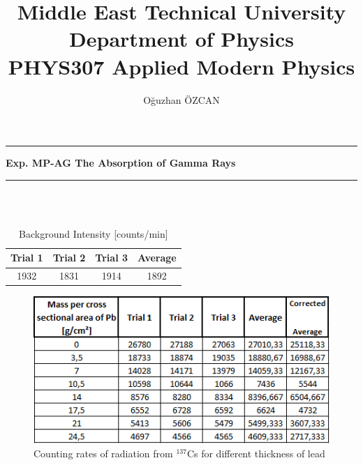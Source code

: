 \documentclass[a4paper,12pt]{article}
\title{Middle East Technical University\\Department of Physics\\\textbf{PHYS307 Applied Modern Physics}}
\author{Oğuzhan ÖZCAN\\}
\date{}
\providecommand{\expname}[1]{\textbf{Exp. MP-AG The Absorption of Gamma Rays} }
\begin{document}
\maketitle

\thispagestyle{fancy}

\noindent\rule{18.4cm}{0.8pt}
\begin{center}
	\expname{arg1}{}
\end{center}


\noindent\rule{18.4cm}{0.8pt}\\\\
\begin{table}[h!]
\begin{center}
	\begin{tabular}{|c|c|c|c|}
	\hline Trial 1 & Trial 2 & Trial 3  & Average \\ 
	\hline 1932 & 1831 & 1914 & 1892 \\ 
	\hline 
\end{tabular}
\end{center}
\caption{Background Intensity [counts/min]} 
\end{table}
\begin{figure}[h!]
\centering
\includegraphics[scale = 1.0]{Capture}
\caption{Counting rates of radiation from $^{137}$Cs for different thickness of lead}
\label{fig:Capture}
\end{figure}
\end{document}
